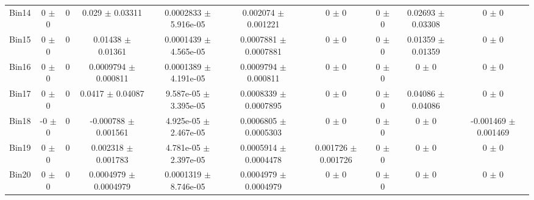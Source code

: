 \begin{tabular}{@{\extracolsep{4pt}}lccccccccc@{}}
     Bin14 & 0 $\pm$ 0 & 0 & 0.029 $\pm$ 0.03311 & 0.0002833 $\pm$ 5.916e-05 & 0.002074 $\pm$ 0.001221 & 0 $\pm$ 0 & 0 $\pm$ 0 & 0.02693 $\pm$ 0.03308 & 0 $\pm$ 0 \\ 
     Bin15 & 0 $\pm$ 0 & 0 & 0.01438 $\pm$ 0.01361 & 0.0001439 $\pm$ 4.565e-05 & 0.0007881 $\pm$ 0.0007881 & 0 $\pm$ 0 & 0 $\pm$ 0 & 0.01359 $\pm$ 0.01359 & 0 $\pm$ 0 \\ 
     Bin16 & 0 $\pm$ 0 & 0 & 0.0009794 $\pm$ 0.000811 & 0.0001389 $\pm$ 4.191e-05 & 0.0009794 $\pm$ 0.000811 & 0 $\pm$ 0 & 0 $\pm$ 0 & 0 $\pm$ 0 & 0 $\pm$ 0 \\ 
     Bin17 & 0 $\pm$ 0 & 0 & 0.0417 $\pm$ 0.04087 & 9.587e-05 $\pm$ 3.395e-05 & 0.0008339 $\pm$ 0.0007895 & 0 $\pm$ 0 & 0 $\pm$ 0 & 0.04086 $\pm$ 0.04086 & 0 $\pm$ 0 \\ 
     Bin18 & -0 $\pm$ 0 & 0 & -0.000788 $\pm$ 0.001561 & 4.925e-05 $\pm$ 2.467e-05 & 0.0006805 $\pm$ 0.0005303 & 0 $\pm$ 0 & 0 $\pm$ 0 & 0 $\pm$ 0 & -0.001469 $\pm$ 0.001469 \\ 
     Bin19 & 0 $\pm$ 0 & 0 & 0.002318 $\pm$ 0.001783 & 4.781e-05 $\pm$ 2.397e-05 & 0.0005914 $\pm$ 0.0004478 & 0.001726 $\pm$ 0.001726 & 0 $\pm$ 0 & 0 $\pm$ 0 & 0 $\pm$ 0 \\ 
     Bin20 & 0 $\pm$ 0 & 0 & 0.0004979 $\pm$ 0.0004979 & 0.0001319 $\pm$ 8.746e-05 & 0.0004979 $\pm$ 0.0004979 & 0 $\pm$ 0 & 0 $\pm$ 0 & 0 $\pm$ 0 & 0 $\pm$ 0 \\ 
\hline\hline
  \end{tabular}
